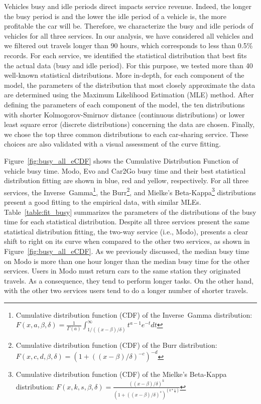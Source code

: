 Vehicles busy and idle periods direct impacts service revenue. Indeed, the longer the busy period is and the lower the idle period of a vehicle is, the more profitable the car will be. Therefore, we characterize the busy and idle periods of vehicles for all three services. In our analysis, we have considered all vehicles and we filtered out travels longer than 90 hours, which corresponds to less than 0.5\% records. 
For each service, we identified the statistical distribution that best fits the actual data (busy and idle period). For this purpose, we tested more than 40 well-known statistical distributions. More in-depth, for each component of the model, the parameters of the distribution that most closely approximate the data are determined using the Maximum Likelihood Estimation (MLE) method. After defining the parameters of each component of the model, the ten distributions with shorter Kolmogorov-Smirnov distance (continuous distributions) or lower least square error (discrete distributions) concerning the data are chosen. Finally, we chose the top three common distributions to each car-sharing service. These choices are also validated with a visual assessment of the curve fitting.

Figure~\ref{fig:busy_all_eCDF} shows the Cumulative Distribution Function of vehicle busy time.  Modo, Evo and Car2Go  busy time and their best statistical distribution fitting are shown in blue, red and yellow, respectively. For all three services, the Inverse~Gamma\footnote{Cumulative distribution function (CDF) of the Inverse~Gamma distribution: $F(x, a, \beta, \delta) = \frac{1}{\Gamma(a)}\int_{1/\left((x-\beta)/\delta\right)}^{\infty}t^{a-1}e^{-t}dt$}, 
the Burr\footnote{Cumulative distribution function (CDF) of the Burr distribution: $F(x,c,d,\beta,\delta)=\left(1 + \left((x-\beta)/\delta\right)^{-c}\right)^{-d}$}, 
and Mielke's Beta-Kappa\footnote{Cumulative distribution function (CDF) of the Mielke's Beta-Kappa distribution: $F(x,k,s,\beta,\delta) = \frac{\left((x-\beta)/\delta\right)^{k}}{(1+\left((x-\beta)/\delta\right)^{s})^{(k*\frac{1}{s})}}$} 
distributions present a  good fitting to the empirical data, with similar MLEs.  
Table~\ref{table:fit_busy} summarizes the parameters of the distributions of the busy time for each statistical distribution.
Despite all three services present the same statistical distribution fitting, 
the two-way service (i.e., Modo), presents a clear shift to right on its curve when compared to the other two services, as shown in Figure~\ref{fig:busy_all_eCDF}. As we previously discussed, the median busy time on Modo is more than one hour longer than the median busy time for the other services. 
Users in Modo must return cars to the same station they originated travels. As a consequence, they tend to perform longer tasks. On the other hand, with the other two services users tend to do a longer number of shorter travels.

